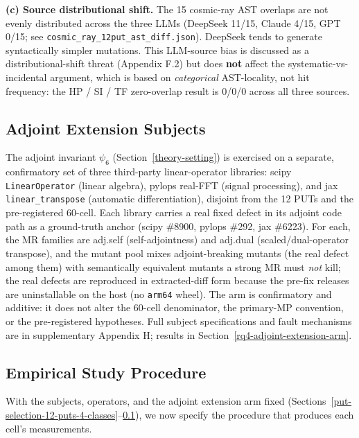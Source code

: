 \documentclass[manuscript,screen,review]{acmart}
\begin{document}
\textbf{(c) Source distributional shift.} The 15 cosmic-ray AST
overlaps are not evenly distributed across the three LLMs (DeepSeek
11/15, Claude 4/15, GPT 0/15; see
\texttt{cosmic\_ray\_12put\_ast\_diff.json}). DeepSeek tends to generate
syntactically simpler mutations. This LLM-source bias is discussed as a
distributional-shift threat
(Appendix F.2) but does \textbf{not} affect the systematic-vs-incidental
argument, which is based on \emph{categorical} AST-locality, not hit
frequency: the HP / SI / TF zero-overlap result is 0/0/0 across all
three sources.

\subsection{Adjoint Extension Subjects}\label{adjoint-extension-arm-subjects}

The adjoint invariant $\psi_6$ (Section~\ref{theory-setting}) is exercised on a separate,
confirmatory set of three third-party linear-operator libraries:
scipy \texttt{LinearOperator} (linear algebra), pylops real-FFT (signal
processing), and jax \texttt{linear\_transpose} (automatic
differentiation), disjoint from the 12 PUTs and the pre-registered
60-cell. Each library carries a real fixed defect in its adjoint code
path as a ground-truth anchor (scipy \#8900, pylops \#292, jax \#6223).
For each, the MR families are adj.self (self-adjointness) and adj.dual
(scaled/dual-operator transpose), and the mutant pool mixes
adjoint-breaking mutants (the real defect among them) with semantically
equivalent mutants a strong MR must \emph{not} kill; the real defects are
reproduced in extracted-diff form because the pre-fix releases are
uninstallable on the host (no \texttt{arm64} wheel). The arm is
confirmatory and additive: it does not alter the 60-cell denominator, the
primary-MP convention, or the pre-registered hypotheses. Full subject
specifications and fault mechanisms are in supplementary Appendix H;
results in Section~\ref{rq4-adjoint-extension-arm}.

\subsection{Empirical Study Procedure}\label{procedure-overview}

With the subjects, operators, and the adjoint extension arm fixed
(Sections~\ref{put-selection-12-puts-4-classes}--\ref{adjoint-extension-arm-subjects}), we now specify the procedure that produces each cell's
measurements.
\end{document}
